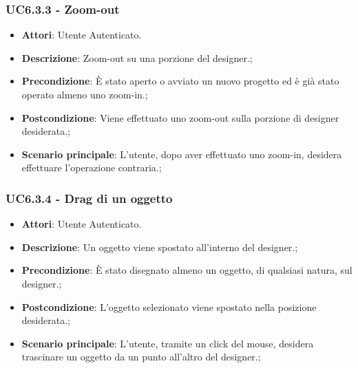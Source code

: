 \subsubsection{UC6.3.3 - Zoom-out} 
\label{sssec:UC6.3.3} 
\begin{itemize} 
\item \textbf{Attori}: Utente Autenticato.
\item \textbf{Descrizione}: Zoom-out su una porzione del designer.;
\item \textbf{Precondizione}: È stato aperto o avviato un nuovo progetto ed è già stato operato almeno uno zoom-in.;
\item \textbf{Postcondizione}: Viene effettuato uno zoom-out sulla porzione di designer desiderata.;
\item \textbf{Scenario principale}: L'utente, dopo aver effettuato uno zoom-in, desidera effettuare l'operazione contraria.;\end{itemize} 
\subsubsection{UC6.3.4 - Drag di un oggetto} 
\label{sssec:UC6.3.4} 
\begin{itemize} 
\item \textbf{Attori}: Utente Autenticato.
\item \textbf{Descrizione}: Un oggetto viene spostato all'interno del designer.;
\item \textbf{Precondizione}: È stato disegnato almeno un oggetto, di qualsiasi natura, sul designer.;
\item \textbf{Postcondizione}: L'oggetto selezionato viene spostato nella posizione desiderata.;
\item \textbf{Scenario principale}: L'utente, tramite un click del mouse, desidera trascinare un oggetto da un punto all'altro del designer.;\end{itemize} 
